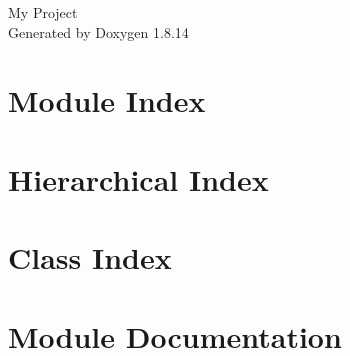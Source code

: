 \documentclass[twoside]{book}
\newcommand{\+}{\discretionary{\mbox{\scriptsize$\hookleftarrow$}}{}{}}
\newcommand{\clearemptydoublepage}{%
  \newpage{\pagestyle{empty}\cleardoublepage}%
}
\begin{document}
\hypersetup{pageanchor=false,
             bookmarksnumbered=true,
             pdfencoding=unicode
            }
\begin{titlepage}
\vspace*{7cm}
\begin{center}%
{\Large My Project }\\
\vspace*{1cm}
{\large Generated by Doxygen 1.8.14}\\
\end{center}
\end{titlepage}
\clearemptydoublepage
{}
\tableofcontents
\clearemptydoublepage
{}
\hypersetup{pageanchor=true}

\chapter{Module Index}

\chapter{Hierarchical Index}

\chapter{Class Index}

\chapter{Module Documentation}



\end{document}
